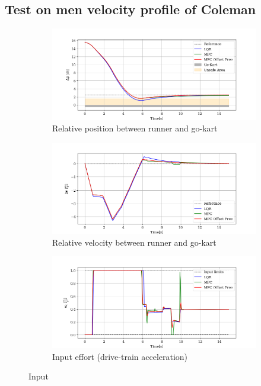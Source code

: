 \documentclass[a4paper,12pt,oneside]{book}
\begin{document}
\subsection{Test on men velocity profile of Coleman}
\begin{figure}[h!]
    \centering
    \begin{subfigure}[t]{0.8\textwidth}
        \includegraphics[width=\textwidth]{Coleman/Deltap.png}
        \caption{Relative position between runner and go-kart}
        \label{fig:Deltapmen}
    \end{subfigure}
    
    \begin{subfigure}[t]{0.8\textwidth}
        \includegraphics[width=\textwidth]{Coleman/Deltav.png}
        \caption{Relative velocity between runner and go-kart}
        \label{fig:Deltaven}
    \end{subfigure}
    
    \begin{subfigure}[t]{0.8\textwidth}
        \includegraphics[width=\textwidth]{Coleman/Input.png}
        \caption{Input effort (drive-train acceleration)}
        \label{fig:Inputmen}
    \end{subfigure}
    \caption{Input}
    \label{fig:Men}
\end{figure}
\end{document}
